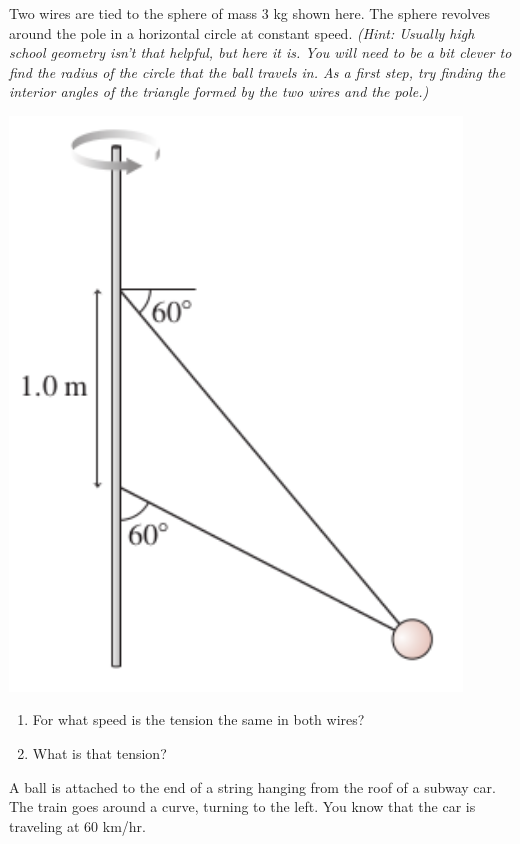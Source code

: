 \documentclass[12pt]{article}
\begin{document}
\begin{enumerate}
\begin{minipage}{0.7\textwidth}
\item Two wires are tied to the sphere of mass 3 kg shown here. The sphere
revolves around the pole in a horizontal circle at constant speed. {\it (Hint: Usually 
high school geometry isn't that helpful, but here it is. You will need to be a bit clever to
find the radius of the circle that the ball travels in. As a first step, try finding the interior angles
of the triangle formed by the two wires and the pole.)}

  \end{minipage}
  \begin{minipage}{0.3\textwidth}
\centerline{\includegraphics[width=0.9\textwidth]{problem837.png}}
  \end{minipage}

\begin{enumerate}
\item For what speed is the tension the same in both wires?
\item What is that tension?
\end{enumerate}

\item A ball is attached to the end of a string hanging from the roof of a subway car. 
The train goes around a curve, turning to the left. You know that the car is traveling at 60 km/hr.


\end{enumerate}
\end{document}
